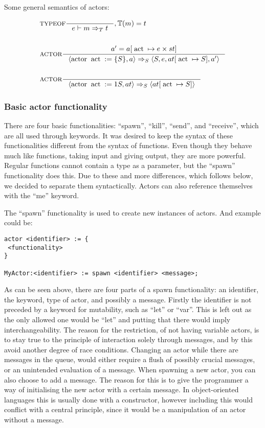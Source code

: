 Some general semantics of actors:

\begin{align*}
&\inference[TYPEOF]{}
                  {e \vdash m \Rightarrow_T t}
									{, \mathbb{T}(m) = t}
\\\\
&\inference[$\text{ACTOR}$]{a' = a[\Tact \mapsto e \times st]}
                           {\Braket{\Tactor \Tact := \{S\}, a} \Rightarrow_S \Braket{S,e,at[\Tact \mapsto S],a'}}
\\\\
&\inference[$\text{ACTOR}$]{}
                           {\Braket{\Tactor \Tact := 1S, at} \Rightarrow_S \Braket{at[\Tact \mapsto S]}}
\end{align*}

\subsubsection{Basic actor functionality}

There are four basic functionalities: \enquote{spawn}, \enquote{kill}, \enquote{send}, and \enquote{receive}, which are all used through keywords. It was desired to keep the syntax of these functionalities different from the syntax of functions. Even though they behave much like functions, taking input and giving output, they are more powerful. Regular functions cannot contain a type as a parameter, but the \enquote{spawn} functionality does this. Due to these and more differences, which follows below, we decided to separate them syntactically. Actors can also reference themselves with the \enquote{me} keyword.

The \enquote{spawn} functionality is used to create new instances of actors. And example could be:

\label{actorfuncSpawn}
\begin{lstlisting}
actor <identifier> := {
 <functionality>
}

MyActor:<identifier> := spawn <identifier> <message>;
\end{lstlisting}

As can be seen above, there are four parts of a spawn functionality: an identifier, the keyword, type of actor, and possibly a message. Firstly the identifier is not preceded by a keyword for mutability, such as \enquote{let} or \enquote{var}. This is left out as the only allowed one would be \enquote{let} and putting that there would imply interchangeability. The reason for the restriction, of not having variable actors, is to stay true to the principle of interaction solely through messages, and by this avoid another degree of race conditions. Changing an actor while there are messages in the queue, would either require a flush of possibly crucial messages, or an unintended evaluation of a message. When spawning a new actor, you can also choose to add a message. The reason for this is to give the programmer a way of initialising the new actor with a certain message. In object-oriented languages this is usually done with a constructor, however including this would conflict with a central principle, since it would be a manipulation of an actor without a message.

